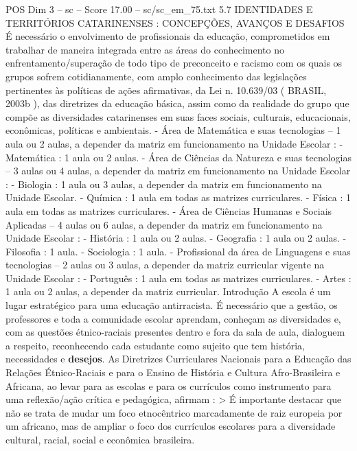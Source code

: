 \begin{textsample}{POS Dim 3 – sc – Score 17.00 – sc/sc\_em\_75.txt}  \label{ex:f3_pos_068}
5.7 IDENTIDADES E TERRITÓRIOS CATARINENSES : CONCEPÇÕES, AVANÇOS E DESAFIOS É necessário o envolvimento de profissionais da educação, comprometidos em trabalhar de maneira integrada entre as áreas do conhecimento no enfrentamento/superação de todo tipo de preconceito e racismo com os quais os grupos sofrem cotidianamente, com amplo conhecimento das legislações pertinentes às políticas de ações afirmativas, da Lei n. 10.639/03 ( BRASIL, 2003b ), das diretrizes da educação básica, assim como da realidade do grupo que compõe as diversidades catarinenses em suas faces sociais, culturais, educacionais, econômicas, políticas e ambientais. - Área de Matemática e suas tecnologias – 1 aula ou 2 aulas, a depender da matriz em funcionamento na Unidade Escolar : - Matemática : 1 aula ou 2 aulas. - Área de Ciências da Natureza e suas tecnologias – 3 aulas ou 4 aulas, a depender da matriz em funcionamento na Unidade Escolar : - Biologia : 1 aula ou 3 aulas, a depender da matriz em funcionamento na Unidade Escolar. - Química : 1 aula em todas as matrizes curriculares. - Física : 1 aula em todas as matrizes curriculares. - Área de Ciências Humanas e Sociais Aplicadas – 4 aulas ou 6 aulas, a depender da matriz em funcionamento na Unidade Escolar : - História : 1 aula ou 2 aulas. - Geografia : 1 aula ou 2 aulas. - Filosofia : 1 aula. - Sociologia : 1 aula. - Profissional da área de Linguagens e suas tecnologias – 2 aulas ou 3 aulas, a depender da matriz curricular vigente na Unidade Escolar : - Português : 1 aula em todas as matrizes curriculares. - Artes : 1 aula ou 2 aulas, a depender da matriz curricular.
Introdução A escola é um lugar estratégico para uma educação antirracista.
É necessário que a gestão, os professores e toda a comunidade escolar aprendam, conheçam as diversidades e, com as questões étnico-raciais presentes dentro e fora da sala de aula, dialoguem a respeito, reconhecendo cada estudante como sujeito que tem história, necessidades e \textbf{desejos}.
As Diretrizes Curriculares Nacionais para a Educação das Relações Étnico-Raciais e para o Ensino de História e Cultura Afro-Brasileira e Africana, ao levar para as escolas e para os currículos como instrumento para uma reflexão/ação crítica e pedagógica, afirmam : > É importante destacar que não se trata de mudar um foco etnocêntrico marcadamente de raiz europeia por um africano, mas de ampliar o foco dos currículos escolares para a diversidade cultural, racial, social e econômica brasileira.

\end{textsample}
